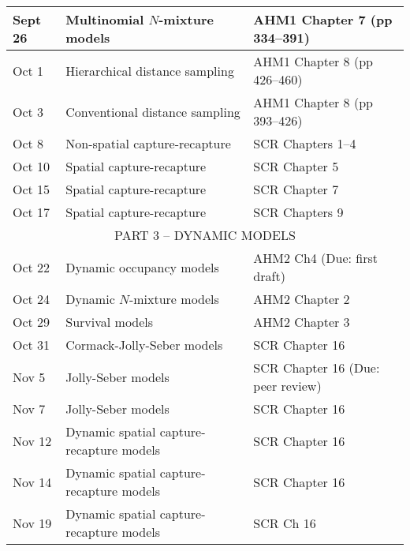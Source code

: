 \documentclass[12pt]{article}
\begin{document}
\begin{center}
\begin{tabular}[c]{lll}
Sept 26    & Multinomial $N$-mixture models               & AHM1 Chapter 7 (pp 334--391)                          \\
\hline
Oct 1      & Hierarchical distance sampling               & AHM1 Chapter 8 (pp 426--460)                          \\
Oct 3      & Conventional distance sampling               & AHM1 Chapter 8 (pp 393--426)                          \\
\hline
Oct 8     & Non-spatial capture-recapture                & SCR Chapters 1--4                                     \\
Oct 10     & Spatial capture-recapture                    & SCR Chapter 5                                         \\
\hline
Oct 15     & Spatial capture-recapture                    & SCR Chapter 7                                         \\
Oct 17     & Spatial capture-recapture                    & SCR Chapters 9                                        \\
\hline
           \multicolumn{3}{c}{PART 3 -- DYNAMIC MODELS}                                                           \\
\hline
Oct 22     & Dynamic occupancy models                     & AHM2 Ch4 (Due: first draft)                           \\
Oct 24     & Dynamic $N$-mixture models                   & AHM2 Chapter 2                                        \\
\hline
Oct 29     & Survival models                               & AHM2 Chapter 3                                        \\
Oct 31      & Cormack-Jolly-Seber models                   & SCR Chapter 16                                        \\
\hline
Nov 5      & Jolly-Seber models                           & SCR Chapter 16 (Due: peer review)                     \\
Nov 7      & Jolly-Seber models                           & SCR Chapter 16                                        \\
\hline
Nov 12     & Dynamic spatial capture-recapture models     & SCR Chapter 16                                        \\
Nov 14     & Dynamic spatial capture-recapture models     & SCR Chapter 16                                        \\
\hline
Nov 19     & Dynamic spatial capture-recapture models     & SCR Ch 16                                             \\

\end{tabular}
\end{center}
\end{document}
